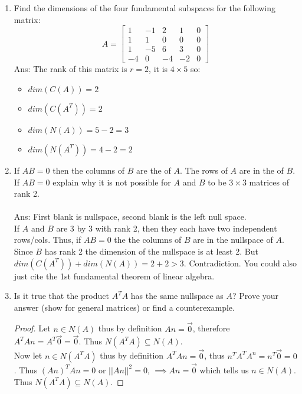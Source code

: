 \documentclass[10pt, a4paper]{article}
\theoremstyle{break}
\begin{document}
\begin{enumerate}
\item  Find the dimensions of the four fundamental subspaces for the following matrix:
\begin{equation}
A=
\begin{bmatrix}
1 & -1 & 2 &1 & 0 \\
1 & 1 & 0 & 0 & 0\\
1 & -5 & 6 & 3 & 0\\
-4 & 0 &-4 & -2 & 0
\end{bmatrix}
\end{equation}
Ans: The rank of this matrix is $r=2$, it is $4 \times 5$ so:
\begin{itemize}
\item $dim(C(A))=2$
\item $dim(C(A^T))=2$
\item $dim(N(A))=5-2=3$
\item $dim(N(A^T))=4-2=2$
\end{itemize}







\item If $AB=0$ then the columns of $B$ are the \underline{\hspace{1cm}} of $A$. The rows of $A$ are in the  \underline{\hspace{1cm}} of $B$. If $AB=0$ explain why it is not possible for $A$ and $B$ to be $3 \times 3$ matrices of rank 2. \\ \\
Ans: First blank is nullspace, second blank is the left null space. \\
If $A$ and $B$ are 3 by 3 with rank 2, then they each have two independent rows/cols. Thus, if $AB=0$ the the columns of $B$ are in the nullspace of $A$. Since $B$ has rank 2 the dimension of the nullspace is at least 2. But $dim(C(A^T))+dim(N(A))=2+2>3$. Contradiction. You could also just cite the 1st fundamental theorem of linear algebra. 







\item Is it true that the product $A^TA$ has the same nullspace as $A$? Prove your answer (show for general matrices) or find a counterexample. \\
\begin{proof}
Let $n \in N(A)$ thus by definition $An=\vec{0}$, therefore $A^TAn=A^T\vec{0}=\vec{0}.$ Thus $N(A^TA) \subseteq N(A)$. \\
Now let $n \in N(A^TA)$ thus by definition $A^TAn=\vec{0}$, thus $n^TA^TA^n=n^T\vec{0}=0$. Thus $(An)^T An=0$ or $||An||^2=0$, $\implies An=\vec{0}$ which tells us $n \in N(A)$. Thus $N(A^TA) \subseteq N(A)$. 


\end{proof}
\end{enumerate}
\end{document}
